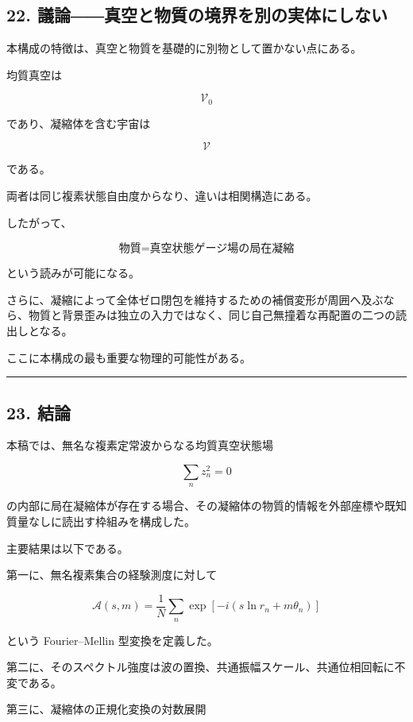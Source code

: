\documentclass[
  a4paper,
]{ltjsarticle}
\begin{document}
\subsection{22.
議論――真空と物質の境界を別の実体にしない}\label{ux8b70ux8ad6ux771fux7a7aux3068ux7269ux8ceaux306eux5883ux754cux3092ux5225ux306eux5b9fux4f53ux306bux3057ux306aux3044}

本構成の特徴は、真空と物質を基礎的に別物として置かない点にある。

均質真空は

\[
\mathcal V_0
\]

であり、凝縮体を含む宇宙は

\[
\mathcal V
\]

である。

両者は同じ複素状態自由度からなり、違いは相関構造にある。

したがって、

\[
\boxed{
\text{物質}
=
\text{真空状態ゲージ場の局在凝縮}
}
\tag{47}
\]

という読みが可能になる。

さらに、凝縮によって全体ゼロ閉包を維持するための補償変形が周囲へ及ぶなら、物質と背景歪みは独立の入力ではなく、同じ自己無撞着な再配置の二つの読出しとなる。

ここに本構成の最も重要な物理的可能性がある。

\begin{center}\rule{0.5\linewidth}{0.5pt}\end{center}

\subsection{23. 結論}\label{ux7d50ux8ad6}

本稿では、無名な複素定常波からなる均質真空状態場

\[
\sum_n z_n^2=0
\]

の内部に局在凝縮体が存在する場合、その凝縮体の物質的情報を外部座標や既知質量なしに読出す枠組みを構成した。

主要結果は以下である。

第一に、無名複素集合の経験測度に対して

\[
\mathcal A(s,m)
=
\frac1N
\sum_n
\exp
\left[
-i
\left(
s\ln r_n+m\theta_n
\right)
\right]
\]

という Fourier--Mellin 型変換を定義した。

第二に、そのスペクトル強度は波の置換、共通振幅スケール、共通位相回転に不変である。

第三に、凝縮体の正規化変換の対数展開
\end{document}
